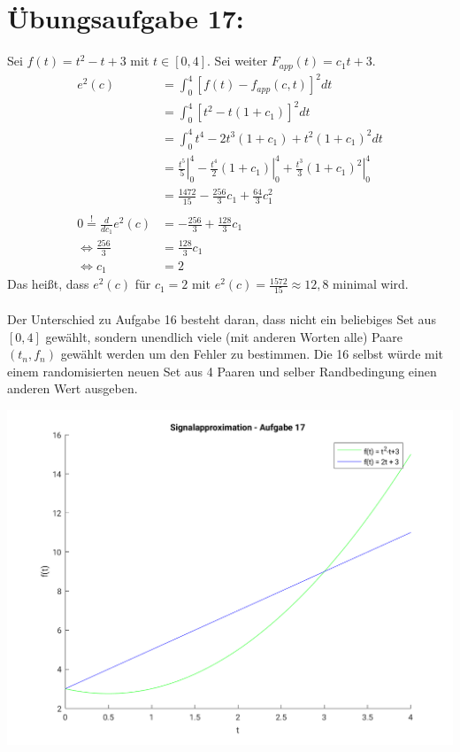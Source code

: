 

	\section*{Übungsaufgabe 17:}
		Sei $f(t) = t^2-t +3$ mit $t\in[0,4]$. Sei weiter $F_{app}(t) = c_1t+3$.
		\begin{align*}
			e^2(c)	&= \int_0^4 \left[ f(t)-f_{app}(c,t) \right]^2 dt\\
					&= \int_0^4 \left[ t^2 -t(1+c_1) \right]^2 dt\\
					&= \int_0^4 t^4 -2t^3(1+c_1) + t^2(1+c_1)^2 dt\\
					&= \left.\frac{t^5}{5}\right|_0^4 - \left.\frac{t^4}{2}(1+c_1)\right|_0^4 + \left.\frac{t^3}{3}(1+c_1)^2 \right|_0^4\\
					&= \frac{1472}{15} - \frac{256}{3}c_1 + \frac{64}{3}c_1^2\\
					&\\
			0\overset{!}{=} \frac{d}{dc_1} e^2(c)	&= -\frac{256}{3} + \frac{128}{3}c_1\\
					\Leftrightarrow	\frac{256}{3}	&= \frac{128}{3}c_1\\
					\Leftrightarrow				c_1	&= 2
		\end{align*}
		Das heißt, dass $e^2(c)$ für $c_1 = 2$ mit $e^2(c) = \frac{1572}{15}\approx 12,8$ minimal wird.\\
		\\
		Der Unterschied zu Aufgabe 16 besteht daran, dass nicht ein beliebiges Set aus $[0,4]$ gewählt, sondern unendlich viele (mit anderen Worten alle) Paare $(t_n, f_n)$ gewählt werden um den Fehler zu bestimmen. Die 16 selbst würde mit einem randomisierten neuen Set aus 4 Paaren und selber Randbedingung einen anderen Wert ausgeben.
		
		\includegraphics[scale = 0.7]{A17_functionPlot.png}
